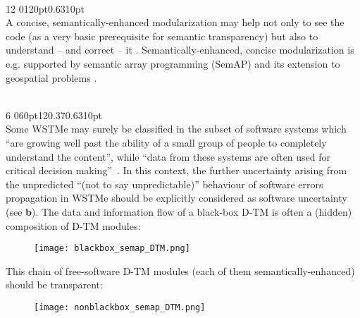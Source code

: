 \documentclass[a4paper,11pt]{article}
\makeatletter
\newenvironment{mtwocols}{\begin{multicols}{2}}{\end{multicols}}
\newcommand{\DTM}{\ensuremath{\mbox{D-}\!\mbox{TM}}}
\def\newparshape{\parshape\@npshape0{}}
\def\@npshape#1#2#3{\ifx\\#3\expandafter\@@@npshape\else\expandafter\@@npshape\fi
{#1}{#2}{#3}}
\def\@@npshape#1#2#3#4#5{\ifnum#3>\z@\expandafter\@firstoftwo\else\expandafter\@secondoftwo\fi
{\expandafter\@@npshape\expandafter{\the\numexpr#1+1\relax}{#2 #4 #5}{\numexpr#3-1\relax}{#4}{#5}}{\@npshape{#1}{#2}}}
\def\@@@npshape#1#2#3{#1 #2 }
\newcommand{\myquote}[2]{{
\rlap{\hspace{\dimexpr0.63\columnwidth+\columnsep}\vspace{-#1}\colorbox{black!10}{
\em\small\begin{tabular}{L{\dimexpr0.63\columnwidth-\columnsep}}
\mbox{\hspace{1pt}}\2mm]
\end{tabular}}}}}
\makeatother
\begin{document}
\begin{mtwocols}  
\newparshape{12}{0pt}{0.63\columnwidth}{1}{0pt}{\columnwidth}\\
\myquote{50mm}{Software errors in complex WSTMe may subtly affect the outcomes with possible consequences even on collective environmental decision-making''\0.2mm]
``The chain of free-software modules should be transparent}
\noindent A concise, semantically-enhanced modularization \cite{de_Rigo_iEMSs2012,de_Rigo_SemAP2012} may help not only to see the code (as a very basic prerequisite for semantic transparency) but also to understand -- and correct -- it \cite{Iverson_1980}. Semantically-enhanced, concise modularization is e.g. supported by semantic array programming (SemAP) \cite{de_Rigo_iEMSs2012,de_Rigo_SemAP2012} and its extension to geospatial problems \cite{de_Rigo_etal_EGU2013,de_Rigo_etal_exp2013}. 

\smallskip

\newparshape{6}{0pt}{\columnwidth}{12}{0.37\columnwidth}{0.63\columnwidth}{1}{0pt}{\columnwidth}\\
Some WSTMe may surely be classified in the subset of software systems which ``are growing well past the ability of a small group of people to completely understand the content'', while ``data from these systems are often used for critical decision \mbox{making}''~\cite{Sanders_Kelly_2008}.  
In this context, the further uncertainty arising from the unpredicted ``(not to say unpredictable)'' \cite{Cerf_2012} behaviour of software errors propagation in WSTMe should be explicitly considered as software uncertainty~\cite{Lehman_1989,Lehman_Ramil_2002} (see {\bf b}). 
The data and information flow of a black-box {\DTM} is often a (hidden) composition of {\DTM} modules:
\begin{figure}[H]
\vspace{-0.5mm} 
\centerline{\texttt{[image: blackbox\_semap\_DTM.png]}}
\vspace{-2.5mm} 
\end{figure}
\noindent This chain of free-software {\DTM} modules
(each of them semantically-enhanced) should be transparent:
\end{mtwocols}


\begin{figure}[H]
\vspace{6mm} 
\centerline{\texttt{[image: nonblackbox\_semap\_DTM.png]}}
\vspace{5mm} 
\end{figure}
\bigskip
\end{document}
